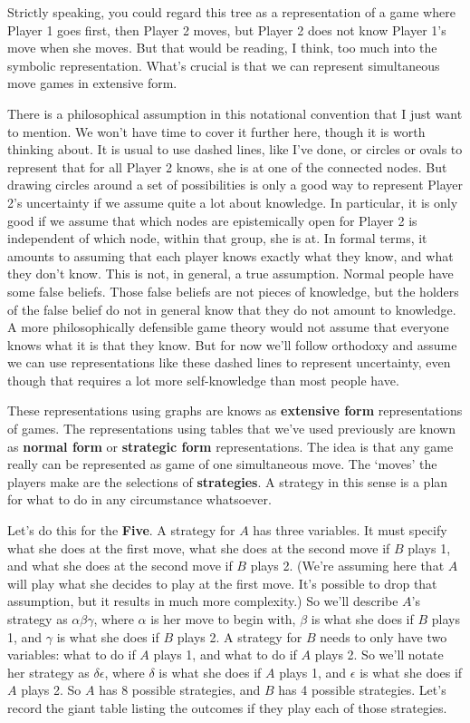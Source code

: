 \documentclass[openany]{book}
\begin{document}
Strictly speaking, you could regard this tree as a representation of a game where Player 1 goes first, then Player 2 moves, but Player 2 does not know Player 1's move when she moves. But that would be reading, I think, too much into the symbolic representation. What's crucial is that we can represent simultaneous move games in extensive form.

There is a philosophical assumption in this notational convention that I just want to mention. We won't have time to cover it further here, though it is worth thinking about. It is usual to use dashed lines, like I've done, or circles or ovals to represent that for all Player 2 knows, she is at one of the connected nodes. But drawing circles around a set of possibilities is only a good way to represent Player 2's uncertainty if we assume quite a lot about knowledge. In particular, it is only good if we assume that which nodes are epistemically open for Player 2 is independent of which node, within that group, she is at. In formal terms, it amounts to assuming that each player knows exactly what they know, and what they don't know. This is not, in general, a true assumption. Normal people have some false beliefs. Those false beliefs are not pieces of knowledge, but the holders of the false belief do not in general know that they do not amount to knowledge. A more philosophically defensible game theory would not assume that everyone knows what it is that they know. But for now we'll follow orthodoxy and assume we can use representations like these dashed lines to represent uncertainty, even though that requires a lot more self-knowledge than most people have.

These representations using graphs are knows as \textbf{extensive form} representations of games. The representations using tables that we've used previously are known as \textbf{normal form} or \textbf{strategic form} representations. The idea is that any game really can be represented as game of one simultaneous move. The `moves' the players make are the selections of \textbf{strategies}. A strategy in this sense is a plan for what to do in any circumstance whatsoever.

Let's do this for the \textbf{Five}. A strategy for $A$ has three variables. It must specify what she does at the first move, what she does at the second move if $B$ plays 1, and what she does at the second move if $B$ plays 2. (We're assuming here that $A$ will play what she decides to play at the first move. It's possible to drop that assumption, but it results in much more complexity.) So we'll describe $A$'s strategy as $\alpha \beta \gamma$, where $\alpha$ is her move to begin with, $\beta$ is what she does if $B$ plays 1, and $\gamma$ is what she does if $B$ plays 2.  A strategy for $B$ needs to only have two variables: what to do if $A$ plays 1, and what to do if $A$ plays 2. So we'll notate her strategy as $\delta \epsilon$, where $\delta$ is what she does if $A$ plays 1, and $\epsilon$ is what she does if $A$ plays 2. So $A$ has 8 possible strategies, and $B$ has 4 possible strategies. Let's record the giant table listing the outcomes if they play each of those strategies.
\end{document}
